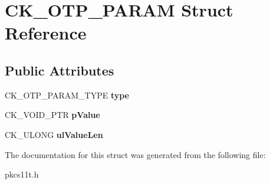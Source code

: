 \hypertarget{struct_c_k___o_t_p___p_a_r_a_m}{}\section{C\+K\+\_\+\+O\+T\+P\+\_\+\+P\+A\+R\+AM Struct Reference}
\label{struct_c_k___o_t_p___p_a_r_a_m}
\subsection*{Public Attributes}
\begin{DoxyCompactItemize}
\item 
\mbox{\label{struct_c_k___o_t_p___p_a_r_a_m_a62fc02521f61dcfa046fd8118edc69dd}} 
C\+K\+\_\+\+O\+T\+P\+\_\+\+P\+A\+R\+A\+M\+\_\+\+T\+Y\+PE {\bfseries type}
\item 
\mbox{\label{struct_c_k___o_t_p___p_a_r_a_m_a21cb84a6ae53333db95cfbb7ba351b4f}} 
C\+K\+\_\+\+V\+O\+I\+D\+\_\+\+P\+TR {\bfseries p\+Value}
\item 
\mbox{\label{struct_c_k___o_t_p___p_a_r_a_m_a1cb40dfa8b0f26ca3f2eabc5297e513c}} 
C\+K\+\_\+\+U\+L\+O\+NG {\bfseries ul\+Value\+Len}
\end{DoxyCompactItemize}


The documentation for this struct was generated from the following file\+:\begin{DoxyCompactItemize}
\item 
pkcs11t.\+h\end{DoxyCompactItemize}
